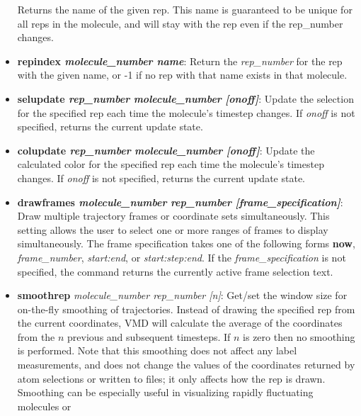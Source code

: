 \begin{itemize}
      Returns the name of the given rep.  This name is
      guaranteed to be unique for all reps in the molecule, and will stay with
      the rep even if the rep\_number changes.  
    \item {\bf repindex {\it molecule\_number name}}: Return the 
      {\it rep\_number} for the rep with the given name, or -1 if no rep with
      that name exists in that molecule.
    \item {\bf selupdate {\it rep\_number} {\it molecule\_number} 
          {\it [onoff]}}: Update the selection for the specified rep each
            time the molecule's timestep changes.  If {\it onoff} is not 
            specified, returns the current update state.
    \item {\bf colupdate {\it rep\_number} {\it molecule\_number} 
          {\it [onoff]}}: Update the calculated color for the specified rep 
          each time the molecule's timestep changes.  If {\it onoff} is not 
          specified, returns the current update state.
    \item {\bf drawframes {\it molecule\_number} {\it rep\_number} {\it [frame\_specification]}}:
           Draw multiple trajectory frames or coordinate sets simultaneously.
           This setting allows the user to select one or more ranges of frames
           to display simultaneously.  The frame specification takes one of the
           following forms {\bf now}, {\it frame\_number}, {\it start:end}, or
           {\it start:step:end}.  If the {\it frame\_specification} is not 
           specified, the command returns the currently active frame 
           selection text.
    \item {\bf smoothrep} {\it molecule\_number rep\_number [n]}:
    Get/set the window size for on-the-fly smoothing of trajectories.  
    Instead of drawing the specified rep from the current coordinates, VMD
    will calculate the average of the coordinates from the $n$ previous
    and subsequent timesteps.  If $n$ is zero then no smoothing is performed.
    Note that this smoothing does not affect any label measurements, and does
    not change the values of the coordinates returned by atom selections or
    written to files; it only affects how the rep is drawn.  Smoothing can
    be especially useful in visualizing rapidly fluctuating molecules or

\end{itemize}
